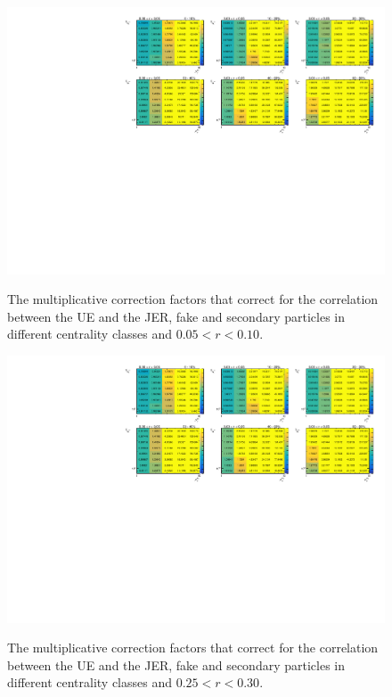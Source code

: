 \begin{figure}[ht]
\centerline{
\includegraphics[page=2,width=1.\textwidth]{figures/main/UE/UE_factors.pdf} \\
}
\caption{
The multiplicative correction factors that correct for the correlation between the UE and the JER, fake and secondary particles in different centrality classes and $ 0.05 < r < 0.10$.}
\label{fig:UEweights_r2}
\end{figure}

\begin{figure}[ht]
\centerline{
\includegraphics[page=6,width=1.\textwidth]{figures/main/UE/UE_factors.pdf} \\
}
\caption{
The multiplicative correction factors that correct for the correlation between the UE and the JER, fake and secondary particles in different centrality classes and $ 0.25 < r < 0.30$.}
\label{fig:UEweights_r6}
\end{figure}

